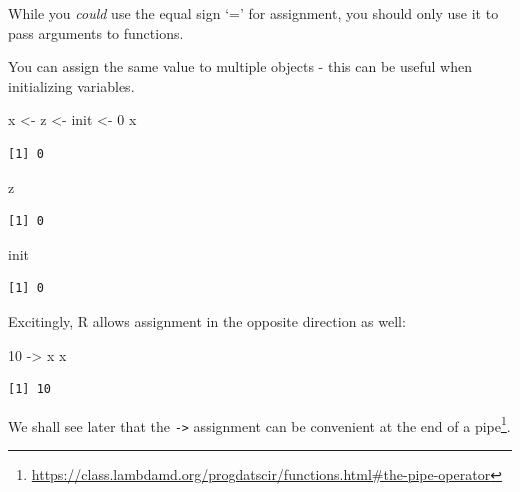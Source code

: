\documentclass[
]{book}
\makeatletter
\newenvironment{Shaded}{\begin{snugshade}}{\end{snugshade}}
\newcommand{\DecValTok}[1]{\textcolor[rgb]{0.00,0.00,0.81}{#1}}
\newcommand{\NormalTok}[1]{#1}
\newcommand{\OtherTok}[1]{\textcolor[rgb]{0.56,0.35,0.01}{#1}}
\renewcommand{\href}[2]{#2\footnote{\url{#1}}}
\newenvironment{kframe}{%
\medskip{}
\setlength{\fboxsep}{.8em}
 \def\at@end@of@kframe{}%
 \ifinner\ifhmode%
  \def\at@end@of@kframe{\end{minipage}}%
  \begin{minipage}{\columnwidth}%
 \fi\fi%
 \def\FrameCommand##1{\hskip\@totalleftmargin \hskip-\fboxsep
 \colorbox{shadecolor}{##1}\hskip-\fboxsep
     \hskip-\linewidth \hskip-\@totalleftmargin \hskip\columnwidth}%
 \MakeFramed {\advance\hsize-\width
   \@totalleftmargin\z@ \linewidth\hsize
   \@setminipage}}%
 {\par\unskip\endMakeFramed%
 \at@end@of@kframe}
\newenvironment{rmdblock}[1]
  {
  \begin{itemize}
  \renewcommand{\labelitemi}{
    \raisebox{-.7\height}[0pt][0pt]{
      {\setkeys{Gin}{width=3em,keepaspectratio}\texttt{[image: images/\#1]}}
    }
  }
  \setlength{\fboxsep}{1em}
  \begin{kframe}
  \item
  }
  {
  \end{kframe}
  \end{itemize}
  }
\newenvironment{note}
  {\begin{rmdblock}{note}}
  {\end{rmdblock}}
\makeatother
\begin{document}
\begin{note}
While you \emph{could} use the equal sign `=' for assignment, you should
only use it to pass arguments to functions.
\end{note}

You can assign the same value to multiple objects - this can be useful when initializing variables.

\begin{Shaded}
\begin{Highlighting}[]
\NormalTok{x }\OtherTok{\textless{}{-}}\NormalTok{ z }\OtherTok{\textless{}{-}}\NormalTok{ init }\OtherTok{\textless{}{-}} \DecValTok{0}
\NormalTok{x}
\end{Highlighting}
\end{Shaded}

\begin{verbatim}
[1] 0
\end{verbatim}

\begin{Shaded}
\begin{Highlighting}[]
\NormalTok{z}
\end{Highlighting}
\end{Shaded}

\begin{verbatim}
[1] 0
\end{verbatim}

\begin{Shaded}
\begin{Highlighting}[]
\NormalTok{init}
\end{Highlighting}
\end{Shaded}

\begin{verbatim}
[1] 0
\end{verbatim}

Excitingly, R allows assignment in the opposite direction as well:

\begin{Shaded}
\begin{Highlighting}[]
\DecValTok{10} \OtherTok{{-}\textgreater{}}\NormalTok{ x}
\NormalTok{x}
\end{Highlighting}
\end{Shaded}

\begin{verbatim}
[1] 10
\end{verbatim}

We shall see later that the \texttt{-\textgreater{}} assignment can be convenient at the end of a \href{https://class.lambdamd.org/progdatscir/functions.html\#the-pipe-operator}{pipe}.
\end{document}
